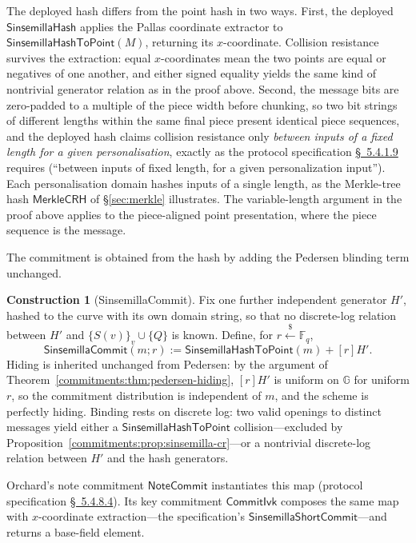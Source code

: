 \documentclass[11pt,a4paper]{article}
\theoremstyle{definition}
\newtheorem{construction}[theorem]{Construction}
\theoremstyle{remark}
\newcommand{\G}{\ensuremath{\mathbb{G}}}
\newcommand{\Fq}{\ensuremath{\mathbb{F}_{q}}}
\begin{document}
The deployed hash differs from the point hash in two ways. First,
the deployed \(\mathsf{SinsemillaHash}\) applies the Pallas
coordinate extractor to \(\mathsf{SinsemillaHashToPoint}(M)\),
returning its \(x\)-coordinate. Collision resistance survives the
extraction: equal \(x\)-coordinates mean the two points are equal or
negatives of one another, and either signed equality yields the same
kind of nontrivial generator relation as in the proof above. Second,
the message bits are zero-padded to a multiple of the piece width
before chunking, so two bit strings of different lengths within the
same final piece present identical piece sequences, and the deployed
hash claims collision resistance only \emph{between inputs of a fixed
length for a given personalisation}, exactly as the protocol
specification
\href{https://zips.z.cash/protocol/protocol.pdf\#concretesinsemillahash}{\S~5.4.1.9}
requires (``between inputs of fixed length, for a given personalization
input''). Each personalisation domain hashes inputs of a single
length, as the Merkle-tree hash \(\mathsf{MerkleCRH}\) of
\S\ref{sec:merkle} illustrates. The variable-length argument in the
proof above applies to the piece-aligned point presentation, where
the piece sequence is the message.

The commitment is obtained from the hash by adding the Pedersen
blinding term unchanged.

\begin{construction}[SinsemillaCommit]
\label{commitments:def:sinsemilla-commit}
Fix one further independent generator \(H'\), hashed to the curve
with its own domain string, so that no discrete-log relation between
\(H'\) and \(\{S(v)\}_v \cup \{Q\}\) is known. Define, for
\(r \xleftarrow{\$} \Fq\),
\[
\mathsf{SinsemillaCommit}(m; r)
:= \mathsf{SinsemillaHashToPoint}(m) + [r]H' .
\]
Hiding is inherited unchanged from Pedersen: by the argument of
Theorem~\ref{commitments:thm:pedersen-hiding}, \([r]H'\) is uniform
on \(\G\) for uniform \(r\), so the commitment distribution is
independent of \(m\), and the scheme is perfectly hiding. Binding
rests on discrete log: two valid openings to distinct messages yield
either a \(\mathsf{SinsemillaHashToPoint}\) collision---excluded by
Proposition~\ref{commitments:prop:sinsemilla-cr}---or a nontrivial
discrete-log relation between \(H'\) and the hash generators.
\end{construction}

Orchard's note commitment \(\mathsf{NoteCommit}\) instantiates this map
(protocol specification
\href{https://zips.z.cash/protocol/protocol.pdf\#concretesinsemillacommit}{\S~5.4.8.4}).
Its key commitment \(\mathsf{CommitIvk}\) composes the same map with
\(x\)-coordinate extraction---the specification's
\(\mathsf{SinsemillaShortCommit}\)---and returns a base-field element.
\end{document}
